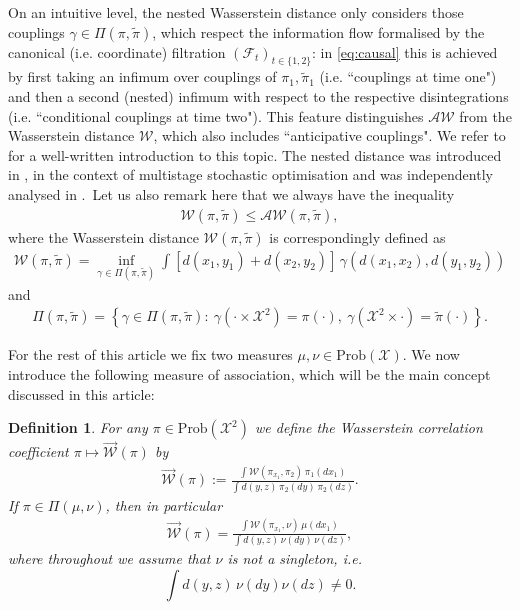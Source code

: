 \documentclass[10pt]{amsart}
\newtheorem{definition}[theorem]{Definition}
\begin{document}
On an intuitive level, the nested Wasserstein distance only considers those couplings $\gamma\in \Pi(\pi, \tilde{\pi})$, which respect the information flow formalised by the canonical (i.e. coordinate) filtration $(\mathcal{F}_t)_{t\in \{1,2\}}$: in \eqref{eq:causal} this is achieved by first taking an infimum over  couplings of $\pi_1, \tilde{\pi}_1$ (i.e. ``couplings at time one") and then a second (nested) infimum with respect to the respective disintegrations (i.e. ``conditional couplings at time two"). This feature distinguishes $\mathcal{AW}$ from the Wasserstein distance $\mathcal{W}$, which also includes ``anticipative couplings". We refer to \cite[pp. 2-3]{BackhoffVeraguas:2019tnb} for a well-written introduction to this topic. The nested distance was introduced in \cite{Pflug:2009hl}, \cite{Pflug:2012bfa} in the context of multistage stochastic optimisation and was independently analysed in \cite{Lassalle:2018hfa}.\
Let us also remark here that we always have the inequality
\begin{align}\label{eq:AW_W}
\mathcal{W}(\pi,\tilde{\pi})\le \mathcal{AW}(\pi,\tilde{\pi}),
\end{align}
where the Wasserstein distance $\mathcal{W}(\pi,\tilde{\pi})$ is correspondingly defined as
\begin{align*}
\mathcal{W}(\pi,\tilde{\pi}) =\inf_{\gamma\in \Pi(\pi,\tilde{\pi})} \int \left[d(x_1,y_1)+d(x_2,y_2)\right]\,\gamma(d(x_1, x_2), d(y_1,y_2))
\end{align*}
and 
\begin{align*}
\Pi(\pi,\tilde{\pi})=\left\{\gamma\in \Pi(\pi,\tilde{\pi}):\ \gamma(\cdot \times \mathcal{X}^2)=\pi(\cdot), \ \gamma (\mathcal{X}^2\times \cdot)=\tilde{\pi}(\cdot)\right\}.
\end{align*}

For the rest of this article we fix two measures $\mu,\nu\in \text{Prob}(\mathcal{X})$. We now introduce the following measure of association, which will be the main concept discussed in this article:

\begin{definition}
For any $\pi\in \text{Prob}(\mathcal{X}^2)$ we define the \emph{Wasserstein correlation coefficient} $\pi\mapsto \overrightarrow{\mathcal{W}}(\pi)$ by
\begin{align*}
\overrightarrow{\mathcal{W}}(\pi):=\frac{\int \mathcal{W}(\pi_{x_1},\pi_2)\,\pi_1(dx_1)}{\int  d(y,z)\,\pi_2(dy)\,\pi_2(dz)}.
\end{align*}
If $\pi\in \Pi(\mu,\nu)$, then  in particular
\begin{align*}
\overrightarrow{\mathcal{W}}(\pi)=\frac{\int \mathcal{W}(\pi_{x_1},\nu)\,\mu(dx_1)}{\int  d(y,z)\,\nu(dy)\,\nu(dz)},
\end{align*}
where throughout we assume that $\nu$ is not a singleton, i.e. $$\int  d(y,z)\,\nu(dy)\nu(dz)\neq 0.$$ 
\end{definition}
\end{document}
